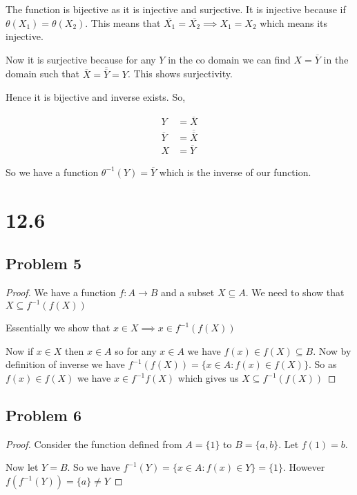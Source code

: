 \documentclass[a4paper]{report}
\begin{document}
The function is bijective as it is injective and surjective. It is injective because if $\theta(X_1) = \theta(X_2)$. This means that $\overline{X_1} = \overline{X_2} \implies X_1 = X_2$ which means its injective.

Now it is surjective because for any $Y $ in the co domain we can find  $X = \overline{Y}$ in the domain such that $\overline{X} = \overline{\overline{Y}} = Y$. This shows surjectivity.

Hence it is bijective and inverse exists.
So,  


\begin{align*}
    Y &= \overline X\\
    \overline{Y} &= \overline{\overline X}\\
    X&= \overline{Y}
\end{align*}

So we have a function $\theta^{-1}(Y) = \overline{Y}$ which is the inverse of our function.

\section*{12.6}
\subsection*{Problem 5}
\begin{proof}
    We have a function $f: A \rightarrow B$ and a subset $X \subseteq A$. We need to show that $X \subseteq f^{-1}(f(X))$

    Essentially we show that  $x \in X \implies x \in f^{-1}(f(X))$

    Now if $x \in X$ then $x \in A$ so for any  $x \in A$ we have $f(x) \in f(X) \subseteq B$.  Now  by definition of inverse we have $f^{-1}(f(X)) = \{x \in A: f(x) \in f(X)\}$. So as $f(x) \in f(X)$ we have $x \in f^{-1}{f(X)}$ which gives us $X \subseteq f^{-1}(f(X))$

\end{proof}

\subsection*{Problem 6}
\begin{proof}
    Consider the function defined from $A = \{1\}$ to  $B = \{a,b\}$. Let $f(1) = b$.

    Now let  $Y = B $. So we have  $f^{-1}(Y) = \{x \in A: f(x) \in Y\} = \{1\}$. However $f(f^{-1}(Y)) = \{a\} \ne Y$ 
    
\end{proof}
\end{document}
